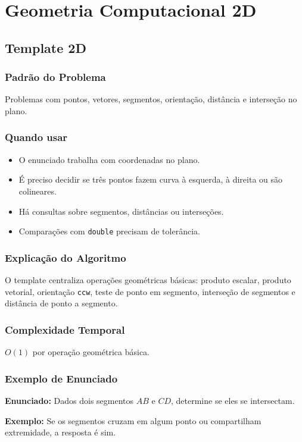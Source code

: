 \chapter{Geometria Computacional 2D}

\section{Template 2D}

\subsection{Padrão do Problema}
Problemas com pontos, vetores, segmentos, orientação, distância e interseção no plano.

\subsection{Quando usar}
\begin{itemize}[nosep]
  \item O enunciado trabalha com coordenadas no plano.
  \item É preciso decidir se três pontos fazem curva à esquerda, à direita ou são colineares.
  \item Há consultas sobre segmentos, distâncias ou interseções.
  \item Comparações com \texttt{double} precisam de tolerância.
\end{itemize}

\subsection{Explicação do Algoritmo}
O template centraliza operações geométricas básicas: produto escalar, produto vetorial, orientação \texttt{ccw}, teste de ponto em segmento, interseção de segmentos e distância de ponto a segmento.

\subsection{Complexidade Temporal}
$O(1)$ por operação geométrica básica.

\subsection{Exemplo de Enunciado}
\begin{exemplodiabox}
\textbf{Enunciado:} Dados dois segmentos $AB$ e $CD$, determine se eles se intersectam.

\textbf{Exemplo:} Se os segmentos cruzam em algum ponto ou compartilham extremidade, a resposta é sim.
\end{exemplodiabox}

